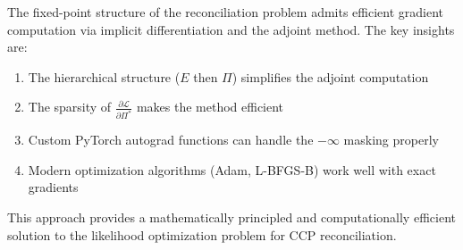 \documentclass[11pt]{article}
\theoremstyle{definition}
\begin{document}
The fixed-point structure of the reconciliation problem admits efficient gradient computation via implicit differentiation and the adjoint method. The key insights are:

\begin{enumerate}
    \item The hierarchical structure ($E$ then $\Pi$) simplifies the adjoint computation
    \item The sparsity of $\frac{\partial \mathcal{L}}{\partial \Pi^*}$ makes the method efficient
    \item Custom PyTorch autograd functions can handle the $-\infty$ masking properly
    \item Modern optimization algorithms (Adam, L-BFGS-B) work well with exact gradients
\end{enumerate}

This approach provides a mathematically principled and computationally efficient solution to the likelihood optimization problem for CCP reconciliation.
\end{document}
